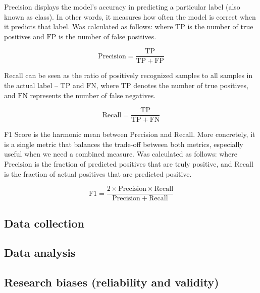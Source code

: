 \medskip
Precision displays the model’s accuracy in predicting a particular label (also known as class).  In other words, it measures how often the model is correct when it predicts that label.  Was calculated as follows: where $\mathrm{TP}$ is the number of true positives and $\mathrm{FP}$ is the  number of false positives.

$$
\mathrm{Precision} 
= \frac{\mathrm{TP}}{\mathrm{TP} + \mathrm{FP}}
$$

\medskip
Recall can be seen as the ratio of positively recognized samples to all samples  in the actual label -- $\mathrm{TP}$ and $\mathrm{FN}$, where $\mathrm{TP}$ denotes the number of true positives, and $\mathrm{FN}$ represents the number of false negatives.

$$
\mathrm{Recall} = \frac{\mathrm{TP}}{\mathrm{TP} + \mathrm{FN}}
$$

\medskip
F1 Score is the harmonic mean between Precision and Recall. More concretely, it is a single metric  that balances the trade-off between both metrics, especially useful when we need a combined measure.  Was calculated as follows: where $\mathrm{Precision}$ is the fraction of predicted positives that are  truly positive, and $\mathrm{Recall}$ is the fraction of actual positives that are predicted positive.

$$
\mathrm{F1} = \frac{2 \times \mathrm{Precision} \times \mathrm{Recall}}
{\mathrm{Precision} + \mathrm{Recall}}
$$

\subsection{Data collection}
%

\subsection{Data analysis}
%

\subsection{Research biases (reliability and validity)}
%
